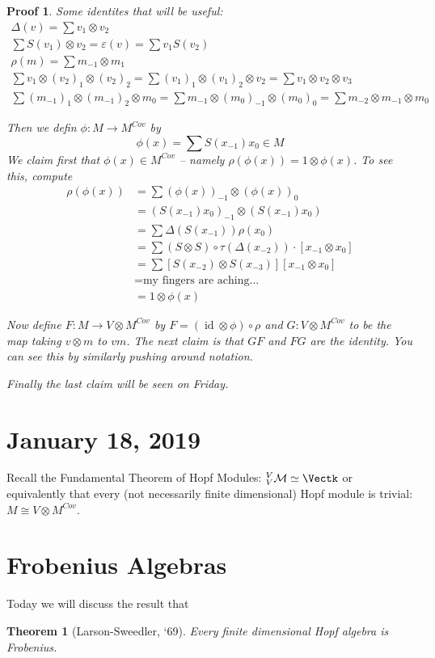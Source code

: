\documentclass[12pt]{article}
\theoremstyle{break}
\theoremstyle{nonumberbreak}
\theoremstyle{changebreak}
\newtheorem{thm}{Theorem}[subsection]
\theoremstyle{break}
\theoremstyle{nonumberbreak}
\newtheorem{prf}{Proof}
\theoremstyle{nonumberplain}
\theoremstyle{change}
\DeclareMathOperator{\id}{id}
\begin{document}
\begin{prf}
	Some identites that will be useful:
	\begin{align*}
		\Delta(v)=\sum v_1\otimes v_2\\
		\sum S(v_1)\otimes v_2=\varepsilon(v)=\sum v_1S(v_2)\\
		\rho(m)=\sum m_{-1}\otimes m_1\\
		\sum v_1\otimes (v_2)_1\otimes (v_2)_2=\sum (v_1)_1\otimes (v_1)_2\otimes v_2=\sum v_1\otimes v_2\otimes v_3\\
		\sum (m_{-1})_1\otimes (m_{-1})_2\otimes m_0=\sum m_{-1}\otimes (m_0)_{-1}\otimes (m_0)_0=\sum m_{-2}\otimes m_{-1}\otimes m_0
	\end{align*}

	Then we defin $\phi:M\to M^{Cov}$ by 
	\[\phi(x)=\sum S(x_{-1})x_0\in M\]
	We claim first that $\phi(x)\in M^{Cov}$ -- namely $\rho(\phi(x))=1\otimes\phi(x)$. To see this, compute
	\begin{align*}
		\rho(\phi(x)) &= \sum (\phi(x))_{-1}\otimes (\phi(x))_0\\
		&= (S(x_{-1})x_0)_{-1}\otimes (S(x_{-1})x_0)\\
		&= \sum\Delta(S(x_{-1}))\rho(x_0)\\
		&= \sum (S\otimes S)\circ \tau(\Delta(x_{-2}))\cdot [x_{-1}\otimes x_0]\\
		&=\sum[S(x_{-2})\otimes S(x_{-3})][x_{-1}\otimes x_0]\\
		&= \text{my fingers are aching...}\\
		&= 1\otimes\phi(x)
	\end{align*}

	Now define $F:M\to V\otimes M^{Cov}$ by $F=(\id\otimes\phi)\circ\rho$ and $G:V\otimes M^{Cov}$ 
	to be the map taking $v\otimes m$ to $vm$. The next claim is that $GF$ and $FG$ are the identity.
	You can see this by similarly pushing around notation.
	
	Finally the last claim will be seen on Friday.
\end{prf}
\section{January 18, 2019}
Recall the Fundamental Theorem of Hopf Modules: $_V^V\mathcal{M}\simeq \Vectk$ or equivalently that
every (not necessarily finite dimensional) Hopf module is trivial: $M\cong V\otimes M^{Cov}$.

\section{Frobenius Algebras}
Today we will discuss the result that
\begin{thm}[Larson-Sweedler, `69]\label{LS-69-2}
	Every finite dimensional Hopf algebra is Frobenius.
\end{thm}
\end{document}
